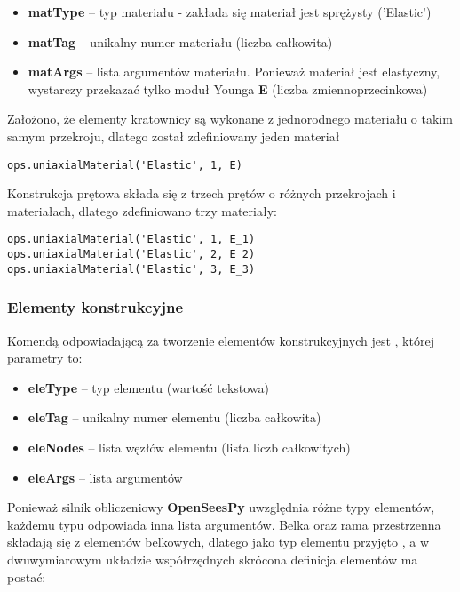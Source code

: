\begin{itemize}
    \item \textbf{matType} – typ materiału - zakłada się materiał jest sprężysty ('Elastic')
    \item \textbf{matTag} – unikalny numer materiału (liczba całkowita)
    \item \textbf{matArgs} – lista argumentów materiału. Ponieważ materiał jest elastyczny, wystarczy przekazać tylko moduł Younga \textbf{E} (liczba zmiennoprzecinkowa)
\end{itemize}

Założono, że elementy kratownicy są wykonane z jednorodnego materiału o takim samym przekroju, dlatego został zdefiniowany jeden materiał

\begin{lstlisting}
ops.uniaxialMaterial('Elastic', 1, E)
\end{lstlisting}

Konstrukcja prętowa składa się z trzech prętów o różnych przekrojach i materiałach, dlatego zdefiniowano trzy materiały:

\begin{lstlisting}
ops.uniaxialMaterial('Elastic', 1, E_1)
ops.uniaxialMaterial('Elastic', 2, E_2)
ops.uniaxialMaterial('Elastic', 3, E_3)
\end{lstlisting}

\subsubsection*{Elementy konstrukcyjne}

Komendą odpowiadającą za tworzenie elementów konstrukcyjnych jest , której parametry to:

\begin{itemize}
    \item \textbf{eleType} – typ elementu (wartość tekstowa)
    \item \textbf{eleTag} – unikalny numer elementu (liczba całkowita)
    \item \textbf{eleNodes} – lista węzłów elementu (lista liczb całkowitych)
    \item \textbf{eleArgs} – lista argumentów
\end{itemize}

Ponieważ silnik obliczeniowy \textbf{OpenSeesPy} uwzględnia różne typy elementów, każdemu typu odpowiada inna lista argumentów.
Belka oraz rama przestrzenna składają się z elementów belkowych, dlatego jako typ elementu przyjęto , a
w dwuwymiarowym układzie współrzędnych skrócona definicja elementów ma postać:


